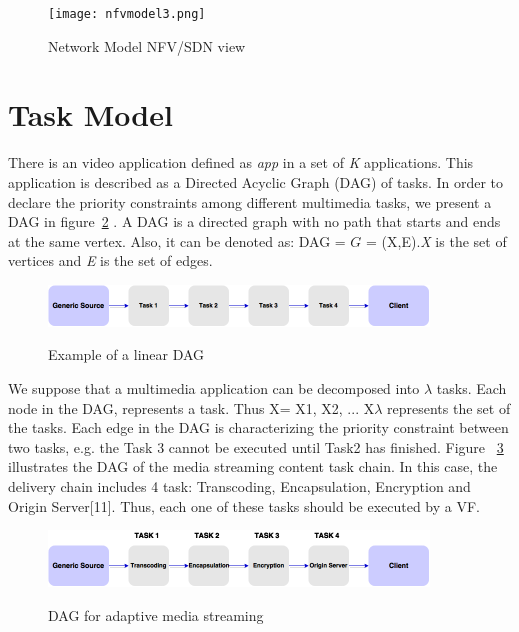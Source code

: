 \documentclass[a4paper]{article}
\begin{document}
\begin{figure}[!ht]
  \caption{Network Model NFV/SDN view}
  \centering
    \texttt{[image: nfvmodel3.png]}
    \label{fig:networkmodelnfvsdn}
\end{figure}

\section{Task Model}
There is an video application defined as \textit{app} in a set of \textit{K} applications. This application is described as a Directed Acyclic Graph (DAG) of tasks. In order to declare the priority constraints among different multimedia tasks, we present a DAG in figure~\ref{fig:generictasks} . A DAG is a directed graph with no path that starts and ends at the same vertex. Also, it can be denoted as: DAG = $G$ = (X,E).\textit{X} is the set of vertices and \textit{E} is the set of edges. 

\begin{figure}[!ht]
  \caption{Example of a linear DAG}
  \centering
    \includegraphics[width=0.9\textwidth]{generic_tasks2.png}
    \label{fig:generictasks}
\end{figure}

We suppose that a multimedia application can be decomposed into $\lambda$ tasks. Each node in the DAG, represents a task. 
Thus X= {X1, X2, ... X$\lambda$} represents the set of the tasks. Each edge in the DAG is characterizing the priority constraint between two tasks, e.g. the Task 3 cannot be executed until Task2 has finished. Figure ~\ref{fig:adaptivestreaming} illustrates the DAG of the media streaming content task chain. In this case, the delivery chain includes 4 task: Transcoding, Encapsulation, Encryption and Origin Server[11]. Thus, each one of these tasks should be executed by a VF.

\begin{figure}[!ht]
  \caption{DAG for adaptive media streaming}
  \centering
    \includegraphics[width=0.9\textwidth]{adaptivestreamingtaks.png}
    \label{fig:adaptivestreaming}
\end{figure}
\end{document}
